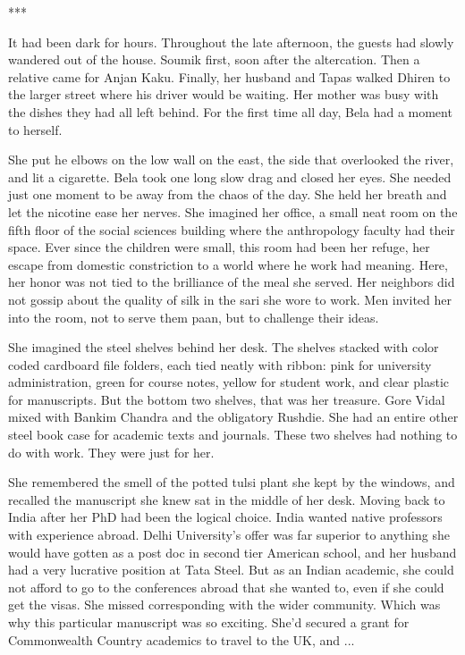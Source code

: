 \documentclass{amsart}
\begin{document}
\begin{center} *** \end{center}

It had been dark for hours. Throughout the late afternoon, the guests had slowly wandered out of the house. Soumik first, soon after the altercation. Then a relative came for Anjan Kaku. Finally, her husband and Tapas walked Dhiren to the larger street where his driver would be waiting. Her mother was busy with the dishes they had all left behind. For the first time all day, Bela had a moment to herself.

She put he elbows on the low wall on the east, the side that overlooked the river, and lit a cigarette. Bela took one long slow drag and closed her eyes. She needed just one moment to be away from the chaos of the day. She held her breath and let the nicotine ease her nerves. She imagined her office, a small neat room on the fifth floor of the social sciences building where the anthropology faculty had their space. Ever since the children were small, this room had been her refuge, her escape from domestic constriction to a world where he work had meaning. Here, her honor was not tied to the brilliance of the meal she served. Her neighbors did not gossip about the quality of silk in the sari she wore to work. Men invited her into the room, not to serve them paan, but to challenge their ideas.

She imagined the steel shelves behind her desk. The shelves stacked with color coded cardboard file folders, each tied neatly with ribbon: pink for university administration, green for course notes, yellow for student work, and clear plastic for manuscripts. But the bottom two shelves, that was her treasure. Gore Vidal mixed with Bankim Chandra and the obligatory Rushdie. She had an entire other steel book case for academic texts and journals. These two shelves had nothing to do with work. They were just for her. 

She remembered the smell of the potted tulsi plant she kept by the windows, and recalled the manuscript she knew sat in the middle of her desk. Moving back to India after her PhD had been the logical choice. India wanted native professors with experience abroad. Delhi University's offer was far superior to anything she would have gotten as a post doc in second tier American school, and her husband had a very lucrative position at Tata Steel. But as an Indian academic, she could not afford to go to the conferences abroad that she wanted to, even if she could get the visas. She missed corresponding with the wider community. Which was why this particular manuscript was so exciting. She'd secured a grant for Commonwealth Country academics to travel to the UK, and ...
\end{document}
